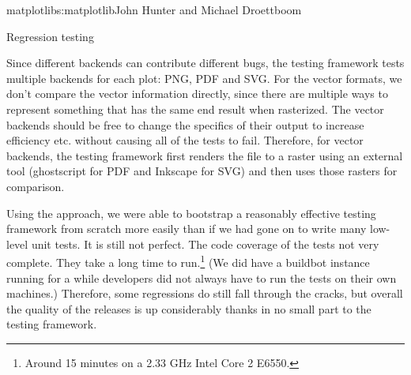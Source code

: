 \begin{aosachapter}{matplotlib}{s:matplotlib}{John Hunter and Michael Droettboom}
\begin{aosasect1}{Regression testing}

Since different backends can contribute different bugs, the testing
framework tests multiple backends for each plot: PNG, PDF and SVG.
For the vector formats, we don't compare the vector information
directly, since there are multiple ways to represent something that
has the same end result when rasterized.  The vector backends should
be free to change the specifics of their output to increase efficiency
etc. without causing all of the tests to fail.  Therefore, for vector
backends, the testing framework first renders the file to a raster
using an external tool (ghostscript for PDF and Inkscape for SVG) and
then uses those rasters for comparison.

Using the approach, we were able to bootstrap a reasonably effective
testing framework from scratch more easily than if we had gone on to
write many low-level unit tests.  It is still not perfect.  The code
coverage of the tests not very complete.  They take a long time to
run.\footnote{Around 15 minutes on a 2.33 GHz Intel Core 2 E6550.}
(We did have a buildbot instance running for a while developers did
not always have to run the tests on their own machines.)  Therefore,
some regressions do still fall through the cracks, but overall the
quality of the releases is up considerably thanks in no small part to
the testing framework.

\end{aosasect1}

\end{aosachapter}


